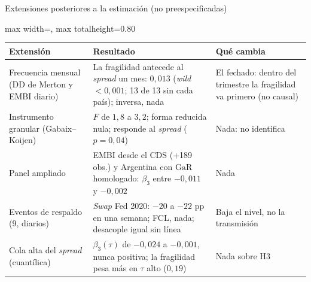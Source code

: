 \documentclass[aspectratio=169]{beamer}
\newcommand{\GaR}{\mathrm{GaR}}
\begin{document}
\begin{frame}{Extensiones posteriores a la estimación (no preespecificadas)}
\centering
\footnotesize
\begin{adjustbox}{max width=\textwidth, max totalheight=0.80\textheight}
\begin{tabular}{>{\raggedright\arraybackslash}p{}>{\raggedright\arraybackslash}p{}>{\raggedright\arraybackslash}p{}}
\toprule
Extensión & Resultado & Qué cambia \\
\midrule
Frecuencia mensual (DD de Merton y EMBI diario) & La fragilidad antecede al \textit{spread} un mes: $0{,}013$ (\textit{wild} $<0{,}001$; 13 de 13 sin cada país); inversa, nada & El fechado: dentro del trimestre la fragilidad va primero (no causal) \\
\addlinespace
Instrumento granular (Gabaix--Koijen) & $F$ de $1{,}8$ a $3{,}2$; forma reducida nula; responde al \textit{spread} ($p=0{,}04$) & Nada: no identifica \\
\addlinespace
Panel ampliado & EMBI desde el CDS (+189 obs.) y Argentina con $\GaR$ homologado: $\beta_3$ entre $-0{,}011$ y $-0{,}002$ & Nada \\
\addlinespace
Eventos de respaldo (9, diarios) & \textit{Swap} Fed 2020: $-20$ a $-22$ pp en una semana; FCL, nada; desacople igual sin línea & Baja el nivel, no la transmisión \\
\addlinespace
Cola alta del \textit{spread} (cuantílica) & $\beta_3(\tau)$ de $-0{,}024$ a $-0{,}001$, nunca positiva; la fragilidad pesa más en $\tau$ alto ($0{,}19$) & Nada sobre H3 \\
\bottomrule
\end{tabular}
\end{adjustbox}
\end{frame}
\end{document}
